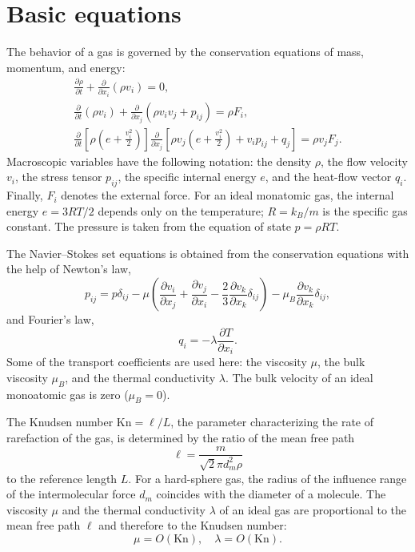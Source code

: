 \documentclass[smallextended, referee]{svjour3} %
\newcommand{\Kn}{\mathrm{Kn}}
\newcommand{\pder}[2][]{\frac{\partial#1}{\partial#2}}
\begin{document}
\section{Basic equations}

The behavior of a gas is governed by the conservation equations of mass, momentum, and energy:
\begin{gather}
    \pder[\rho]{t} + \pder{x_i}(\rho v_i) = 0, \label{eq:mass}\\
    \pder{t}(\rho v_i) + \pder{x_j}(\rho v_i v_j + p_{ij}) = \rho F_i, \label{eq:momentum}\\
    \pder{t}\left[\rho\left(e+\frac{v_i^2}2\right)\right]
        \pder{x_j}\left[\rho v_j\left(e+\frac{v_i^2}2\right)+v_i p_{ij}+q_j\right] = \rho v_j F_j. \label{eq:energy}
\end{gather}
Macroscopic variables have the following notation: the density \(\rho\), the flow velocity \(v_i\),
the stress tensor \(p_{ij}\), the specific internal energy \(e\), and the heat-flow vector \(q_i\).
Finally, \(F_i\) denotes the external force.
For an ideal monatomic gas, the internal energy \(e = 3RT/2\) depends only on the temperature;
\(R = k_B / m\) is the specific gas constant.
The pressure is taken from the equation of state \( p = \rho RT \).

The Navier--Stokes set equations is obtained from the conservation equations with the help of Newton's law,
\begin{equation}\label{eq:Newton_law}
    p_{ij} = p\delta_{ij} - \mu\left(\pder[v_i]{x_j}+\pder[v_j]{x_i}-\frac23\pder[v_k]{x_k}\delta_{ij}\right) -
        \mu_B\pder[v_k]{x_k}\delta_{ij},
\end{equation}
and Fourier's law,
\begin{equation}\label{eq:Fourier_law}
    q_i = -\lambda\pder[T]{x_i}.
\end{equation}
Some of the transport coefficients are used here:
the viscosity \(\mu\), the bulk viscosity \(\mu_B\), and the thermal conductivity \(\lambda\).
The bulk velocity of an ideal monoatomic gas is zero (\(\mu_B = 0\)).

The Knudsen number \(\Kn = \ell/L\), the parameter characterizing the rate of rarefaction of the gas,
is determined by the ratio of the mean free path \[ \ell = \frac{m}{\sqrt2\pi d_m^2 \rho} \]
to the reference length \(L\).
For a hard-sphere gas, the radius of the influence range of the intermolecular force \(d_m\)
coincides with the diameter of a molecule.
The viscosity \(\mu\) and the thermal conductivity \(\lambda\) of an ideal gas
are proportional to the mean free path \(\ell\) and therefore to the Knudsen number:
\begin{equation}
    \mu = O(\Kn), \quad \lambda = O(\Kn).
\end{equation}
\end{document}
